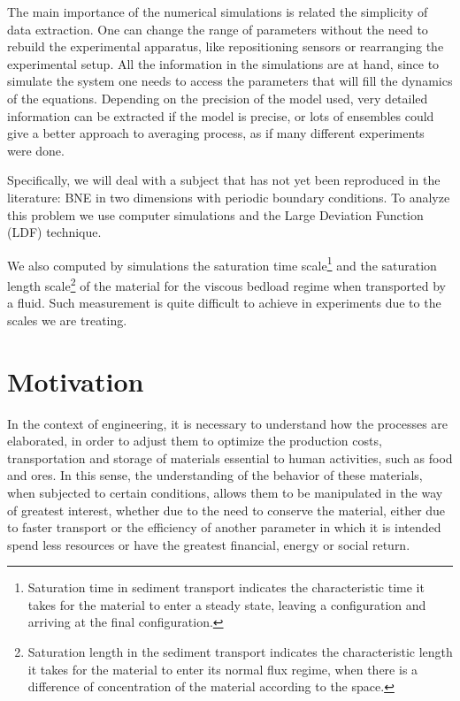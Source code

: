     The main importance of the numerical simulations is related the simplicity of data extraction. One can change the range of parameters without the need to rebuild the experimental apparatus, like repositioning sensors or rearranging the experimental setup. All the information in the simulations are at hand, since to simulate the system one needs to access the parameters that will fill the dynamics of the equations. Depending on the precision of the model used, very detailed information can be extracted if the model is precise, or lots of ensembles could give a better approach to averaging process, as if many different experiments were done.

    Specifically, we will deal with a subject that has not yet been reproduced in the literature: BNE in two dimensions with periodic boundary conditions. To analyze this problem we use computer simulations and the Large Deviation Function (LDF) \cite{Large_Deviations_in_Physics} technique.

    We also computed by simulations the saturation time scale\footnote{Saturation time in sediment transport indicates the characteristic time it takes for the material to enter a steady state, leaving a configuration and arriving at the final configuration.} and the saturation length scale\footnote{Saturation length in the sediment transport indicates the characteristic length it takes for the material to enter its normal flux regime, when there is a difference of concentration of the material according to the space.} of the material for the viscous bedload regime when transported by a fluid. Such measurement is quite difficult to achieve in experiments due to the scales we are treating.

\section{Motivation}
\label{sec:motivacao}
    In the context of engineering, it is necessary to understand how the processes are elaborated, in order to adjust them to optimize the production costs, transportation and storage of materials essential to human activities, such as food and ores. In this sense, the understanding of the behavior of these materials, when subjected to certain conditions, allows them to be manipulated in the way of greatest interest, whether due to the need to conserve the material, either due to faster transport or the efficiency of another parameter in which it is intended spend less resources or have the greatest financial, energy or social return.

